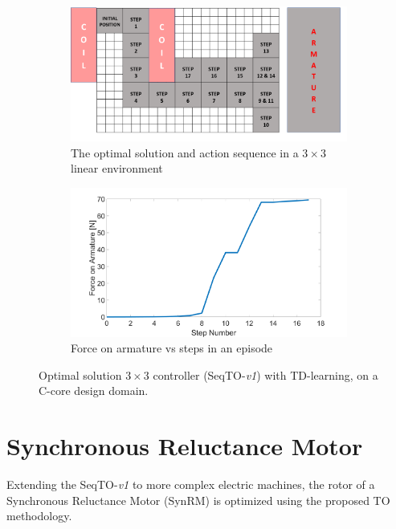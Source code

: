 \begin{figure}[h!]
    \centering
    \begin{subfigure}{.45\textwidth}
        \includegraphics[width=\linewidth]{Figures/Ch_MDP/agent_result_TDlearning.png}
        \caption{The optimal solution and action sequence in a $3 \times 3$ linear environment}
        \label{subfig:td_linear_action_seq}  
    \end{subfigure}
    \begin{subfigure}{.45\textwidth}
        \includegraphics[width=\linewidth]{Figures/Ch_MDP/Force_arm_TD_lear.png}
        \caption{Force on armature vs steps in an episode}
        \label{subfig:td_linear_force_v_steps}  
    \end{subfigure}
    \caption{Optimal solution $3 \times 3$ controller (SeqTO-\textit{v1}) with TD-learning, on a C-core design domain.}
\end{figure}

\section{Synchronous Reluctance Motor}

Extending the SeqTO-\textit{v1} to more complex electric machines, the rotor of a Synchronous Reluctance Motor (SynRM) is optimized using the proposed TO methodology.

